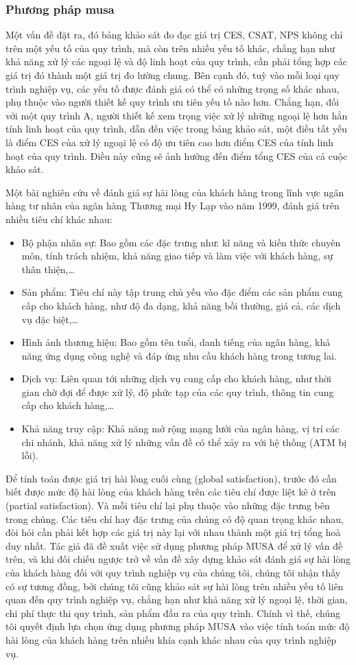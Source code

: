 \subsubsection{Phương pháp \acrshort*{musa}}
Một vấn đề đặt ra, đó bảng khảo sát đo đạc giá trị CES, CSAT, NPS không chỉ trên một yếu tố của quy trình, mà còn trên nhiều yếu tố khác, chẳng hạn như khả năng xử lý các ngoại lệ và độ linh hoạt của quy trình, cần phải tổng hợp các giá trị đó thành một giá trị đo lường chung. Bên cạnh đó, tuỳ vào mỗi loại quy trình nghiệp vụ, các yếu tố được đánh giá có thể có những trọng số khác nhau, phụ thuộc vào người thiết kế quy trình ưu tiên yếu tố nào hơn. Chẳng hạn, đối với một quy trình A, người thiết kế xem trọng việc xử lý những ngoại lệ hơn hẳn tính linh hoạt của quy trình, dẫn đến việc trong bảng khảo sát, một điều tất yếu là điểm CES của xử lý ngoại lệ có độ ưu tiên cao hơn điểm CES của tính linh hoạt của quy trình. Điều này cũng sẽ ảnh hưởng đến điểm tổng CES của cả cuộc khảo sát.
\par
Một bài nghiên cứu về đánh giá sự hài lòng của khách hàng trong lĩnh vực ngân hàng tư nhân của ngân hàng Thương mại Hy Lạp vào năm 1999, đánh giá trên nhiều tiêu chí khác nhau:
\begin{itemize}
    \item Bộ phận nhân sự: Bao gồm các đặc trưng như: kĩ năng và kiến thức chuyên môn, tính trách nhiệm, khả năng giao tiếp và làm việc với khách hàng, sự thân thiện,…
    \item Sản phẩm: Tiêu chí này tập trung chủ yếu vào đặc điểm các sản phẩm cung cấp cho khách hàng, như độ đa dạng, khả năng bồi thường, giá cả, các dịch vụ đặc biệt,…
    \item Hình ảnh thương hiệu: Bao gồm tên tuổi, danh tiếng của ngân hàng, khả năng ứng dụng công nghệ và đáp ứng nhu cầu khách hàng trong tương lai.
    \item Dịch vụ: Liên quan tới những dịch vụ cung cấp cho khách hàng, như thời gian chờ đợi để được xử lý, độ phức tạp của các quy trình, thông tin cung cấp cho khách hàng,…
    \item Khả năng truy cập: Khả năng mở rộng mạng lưới của ngân hàng, vị trí các chi nhánh, khả năng xử lý những vấn đề có thể xảy ra với hệ thống (ATM bị lỗi).
\end{itemize}
Để tính toán được giá trị hài lòng cuối cùng (global satisfaction), trước đó cần biết được mức độ hài lòng của khách hàng trên các tiêu chí được liệt kê ở trên (partial satisfaction). Và mỗi tiêu chí lại phụ thuộc vào những đặc trưng bên trong chúng. Các tiêu chí hay đặc trưng của chúng có độ quan trọng khác nhau, đòi hỏi cần phải kết hợp các giá trị này lại với nhau thành một giá trị tổng hoà duy nhất. Tác giả đã đề xuất việc sử dụng phương pháp MUSA để xử lý vấn đề trên, và khi đối chiếu ngược trở về vấn đề xây dựng khảo sát đánh giá sự hài lòng của khách hàng đối với quy trình nghiệp vụ của chúng tôi, chúng tôi nhận thấy có sự tương đồng, bởi chúng tôi cũng khảo sát sự hài lòng trên nhiều yếu tố liên quan đến quy trình nghiệp vụ, chẳng hạn như khả năng xử lý ngoại lệ, thời gian, chi phí thực thi quy trình, sản phẩm đầu ra của quy trình. Chính vì thế, chúng tôi quyết định lựa chọn ứng dụng phương pháp MUSA vào việc tính toán mức độ hài lòng của khách hàng trên nhiều khía cạnh khác nhau của quy trình nghiệp vụ. 
